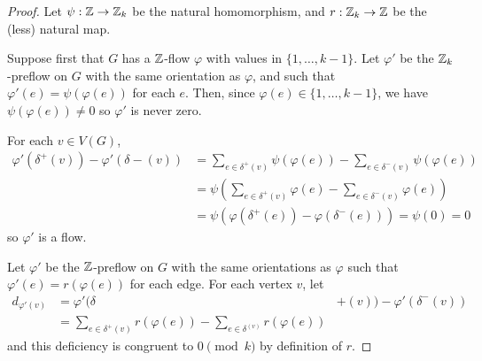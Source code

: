 \documentclass[main.tex]{subfiles}
\begin{document}
\begin{proof}
  Let $\psi:\mathbb Z\to\mathbb Z_k$ be the natural homomorphism, and $r:\mathbb Z_k\to\mathbb Z$ be
  the (less) natural map.

  Suppose first that $G$ has a $\mathbb Z$-flow $\varphi$ with values in $\{1,\ldots,k-1\}$.
  Let $\varphi'$ be the $\mathbb Z_k$-preflow on $G$ with the same orientation as $\varphi$,
  and such that $\varphi'(e) = \psi(\varphi(e))$ for each $e$.
  Then, since $\varphi(e)\in\{1,\ldots,k-1\}$, we have $\psi(\varphi(e))\neq 0$
  so $\varphi'$ is never zero.

  For each $v\in V(G)$,
  \begin{align*}
    \varphi'(\delta^+(v)) - \varphi'(\delta-(v))
    &= \sum_{e\in\delta^+(v)}\psi(\varphi(e)) - \sum_{e\in\delta^-(v)}\psi(\varphi(e)) \\
    &= \psi\left(\sum_{e\in\delta^+(v)}\varphi(e) - \sum_{e\in\delta^-(v)}\varphi(e)\right)
      \tag{because $\psi$ is a homomorphism} \\
    &= \psi(\varphi(\delta^+(e)) - \varphi(\delta^-(e))) = \psi(0) = 0
  \end{align*}
  so $\varphi'$ is a flow.

  Let $\varphi'$ be the $\mathbb Z$-preflow on $G$ with the same orientations as
  $\varphi$ such that $\varphi'(e) = r(\varphi(e))$ for each edge.
  For each vertex $v$, let
  \begin{align*}
    d_{\varphi'(v)}
    &= \varphi'(\delta&+(v)) - \varphi'(\delta^-(v)) \\
    &= \sum_{e\in\delta^+(v)}r(\varphi(e)) - \sum_{e\in\delta^(v)}r(\varphi(e))
  \end{align*}
  and this deficiency is congruent to $0\pmod k$ by definition of $r$.
\end{proof}
\end{document}

